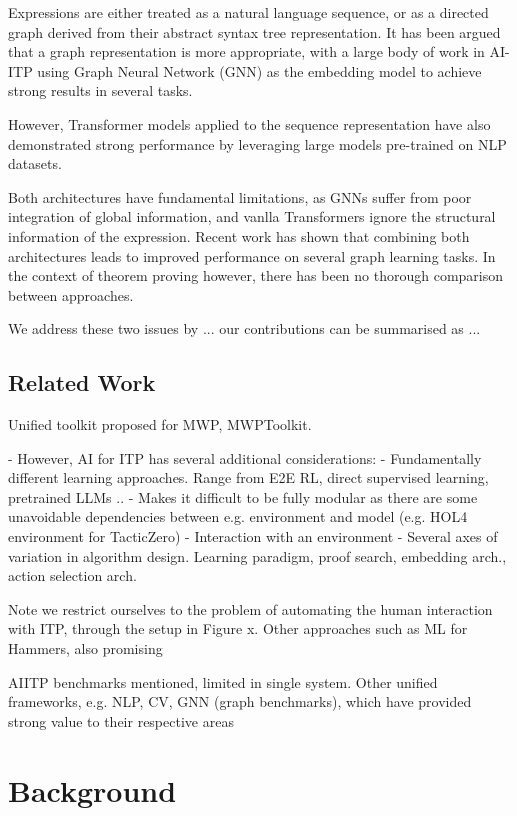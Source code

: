 \documentclass[letterpaper]{article} %
\begin{document}
    Expressions are either treated as a natural language sequence, or as a directed graph derived from their abstract syntax tree
    representation. It has been argued that a graph representation is more appropriate, with a large body of work in AI-ITP
    using Graph Neural Network (GNN) as the embedding model to achieve strong results in several tasks.

    However, Transformer models applied to the sequence representation have also demonstrated strong performance by
    leveraging large models pre-trained on NLP datasets.

    Both architectures have fundamental limitations, as GNNs suffer from poor integration of global information, and vanlla
    Transformers ignore the structural information of the expression.
    Recent work has shown that combining both architectures leads to improved performance on several graph learning tasks.
    In the context of theorem proving however, there has been no thorough comparison between approaches.

    We address these two issues by ... our contributions can be summarised as ...

    \subsection{Related Work}
    Unified toolkit proposed for MWP, MWPToolkit.

    - However, AI for ITP has several additional considerations:
    - Fundamentally different learning approaches. Range from E2E RL, direct supervised learning, pretrained LLMs ..
    - Makes it difficult to be fully modular as there are some unavoidable dependencies between e.g. environment and
    model (e.g. HOL4 environment for TacticZero)
    - Interaction with an environment
    - Several axes of variation in algorithm design. Learning paradigm, proof search, embedding arch., action selection
    arch.

    Note we restrict ourselves to the problem of automating the human interaction with ITP, through the setup in Figure x.
    Other approaches such as ML for Hammers, also promising

    AIITP benchmarks mentioned, limited in single system.
    Other unified frameworks, e.g. NLP, CV, GNN (graph benchmarks), which have provided strong value to their respective areas


    \section{Background}
\end{document}
